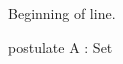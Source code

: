 \documentclass{article}
\begin{document}
\noindent Beginning of line.
\begin{code}
postulate A : Set
\end{code}
\end{document}

